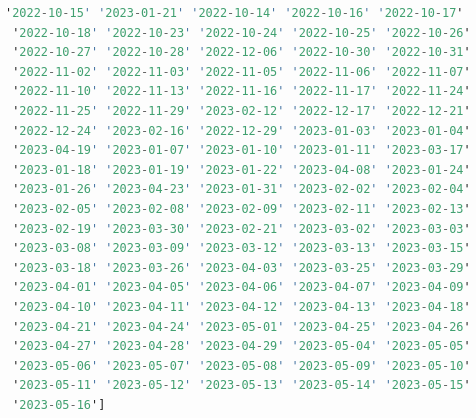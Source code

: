 \begin{lstlisting}[language=haskell, caption=Valores por columna, captionpos=b, label=lst:fiboHaskell]
 '2022-10-15' '2023-01-21' '2022-10-14' '2022-10-16' '2022-10-17'
 '2022-10-18' '2022-10-23' '2022-10-24' '2022-10-25' '2022-10-26'
 '2022-10-27' '2022-10-28' '2022-12-06' '2022-10-30' '2022-10-31'
 '2022-11-02' '2022-11-03' '2022-11-05' '2022-11-06' '2022-11-07'
 '2022-11-10' '2022-11-13' '2022-11-16' '2022-11-17' '2022-11-24'
 '2022-11-25' '2022-11-29' '2023-02-12' '2022-12-17' '2022-12-21'
 '2022-12-24' '2023-02-16' '2022-12-29' '2023-01-03' '2023-01-04'
 '2023-04-19' '2023-01-07' '2023-01-10' '2023-01-11' '2023-03-17'
 '2023-01-18' '2023-01-19' '2023-01-22' '2023-04-08' '2023-01-24'
 '2023-01-26' '2023-04-23' '2023-01-31' '2023-02-02' '2023-02-04'
 '2023-02-05' '2023-02-08' '2023-02-09' '2023-02-11' '2023-02-13'
 '2023-02-19' '2023-03-30' '2023-02-21' '2023-03-02' '2023-03-03'
 '2023-03-08' '2023-03-09' '2023-03-12' '2023-03-13' '2023-03-15'
 '2023-03-18' '2023-03-26' '2023-04-03' '2023-03-25' '2023-03-29'
 '2023-04-01' '2023-04-05' '2023-04-06' '2023-04-07' '2023-04-09'
 '2023-04-10' '2023-04-11' '2023-04-12' '2023-04-13' '2023-04-18'
 '2023-04-21' '2023-04-24' '2023-05-01' '2023-04-25' '2023-04-26'
 '2023-04-27' '2023-04-28' '2023-04-29' '2023-05-04' '2023-05-05'
 '2023-05-06' '2023-05-07' '2023-05-08' '2023-05-09' '2023-05-10'
 '2023-05-11' '2023-05-12' '2023-05-13' '2023-05-14' '2023-05-15'
 '2023-05-16']


\end{lstlisting}
